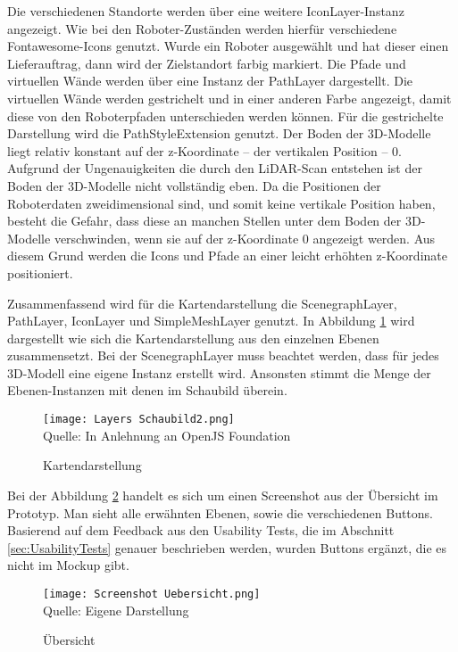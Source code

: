Die verschiedenen Standorte werden über eine weitere IconLayer-Instanz angezeigt. Wie bei den Roboter-Zuständen werden hierfür verschiedene Fontawesome-Icons genutzt. Wurde ein Roboter ausgewählt und hat dieser einen Lieferauftrag, dann wird der Zielstandort farbig markiert. Die Pfade und virtuellen Wände werden über eine Instanz der PathLayer \cite{DeckglPathLayer} dargestellt. Die virtuellen Wände werden gestrichelt und in einer anderen Farbe angezeigt, damit diese von den Roboterpfaden unterschieden werden können. Für die gestrichelte Darstellung wird die PathStyleExtension \cite{DeckglPathStyleExtension} genutzt. Der Boden der 3D-Modelle liegt relativ konstant auf der z-Koordinate – der vertikalen Position – 0. Aufgrund der Ungenauigkeiten die durch den \ac{LiDAR}-Scan entstehen ist der Boden der 3D-Modelle nicht vollständig eben. Da die Positionen der Roboterdaten zweidimensional sind, und somit keine vertikale Position haben, besteht die Gefahr, dass diese an manchen Stellen unter dem Boden der 3D-Modelle verschwinden, wenn sie auf der z-Koordinate 0 angezeigt werden. Aus diesem Grund werden die Icons und Pfade an einer leicht erhöhten z-Koordinate positioniert.

Zusammenfassend wird für die Kartendarstellung die ScenegraphLayer, PathLayer, IconLayer und SimpleMeshLayer genutzt. In Abbildung \ref{fig:MapSchematic} wird dargestellt wie sich die Kartendarstellung aus den einzelnen Ebenen zusammensetzt. Bei der ScenegraphLayer muss beachtet werden, dass für jedes 3D-Modell eine eigene Instanz erstellt wird. Ansonsten stimmt die Menge der Ebenen-Instanzen mit denen im Schaubild überein.

\begin{figure}[H]
    \caption{Kartendarstellung}\label{fig:MapSchematic}
    \texttt{[image: Layers Schaubild2.png]}
    \\
    Quelle: In Anlehnung an OpenJS Foundation \cite{DeckglBaseMaps}
\end{figure}

Bei der Abbildung \ref{fig:OverviewScreenshot} handelt es sich um einen Screenshot aus der Übersicht im Prototyp. Man sieht alle erwähnten Ebenen, sowie die verschiedenen Buttons. Basierend auf dem Feedback aus den Usability Tests, die im Abschnitt \ref{sec:UsabilityTests} genauer beschrieben werden, wurden Buttons ergänzt, die es nicht im \gls{Mockup} gibt.

\begin{figure}[H]
    \caption{Übersicht}\label{fig:OverviewScreenshot}
    \texttt{[image: Screenshot Uebersicht.png]}
    \\
    Quelle: Eigene Darstellung
\end{figure}

